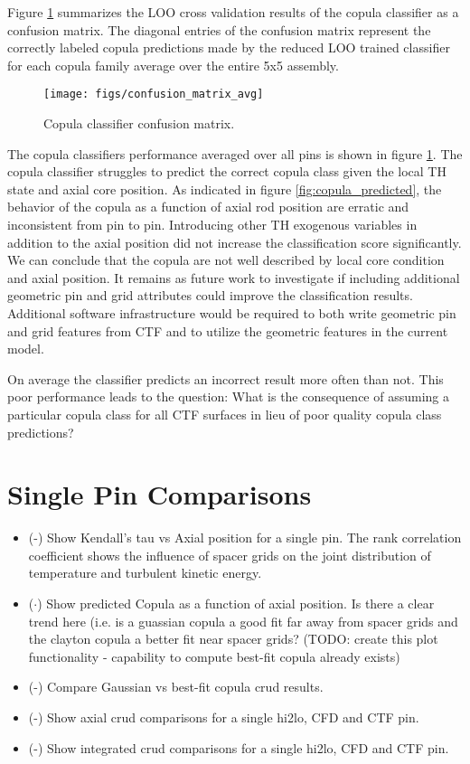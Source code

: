 Figure \ref{fig:confusionmatrixavg} summarizes the LOO cross validation results of the copula classifier as a confusion matrix.  The diagonal entries of the confusion matrix represent the correctly labeled copula predictions made by the reduced LOO trained classifier for each copula family average over the entire 5x5 assembly.

\begin{figure}[H]
    \centering
    \texttt{[image: figs/confusion\_matrix\_avg]}
    \caption[Copula classifier confusion matrix.]{Copula classifier confusion matrix.}
    \label{fig:confusionmatrixavg}
\end{figure}


The copula classifiers performance averaged over all pins is shown in figure \ref{fig:confusionmatrixavg}. The copula classifier struggles to predict the correct copula class given the local TH state and axial core position.  As indicated in figure \ref{fig:copula_predicted}, the behavior of the copula as a function of axial rod position are erratic and inconsistent from pin to pin.  Introducing other TH exogenous variables in addition to the axial position did not increase the classification score significantly.  We can conclude that the copula are not well described by local core condition and axial position.  It remains as future work to investigate if including additional geometric pin and grid attributes could improve the classification results.  Additional software infrastructure would be required to both write geometric pin and grid features from CTF and to utilize the geometric features in the current model.

On average the classifier predicts an incorrect result more often than not.  This poor performance leads to the question:  What is the consequence of assuming a particular copula class for all CTF surfaces in lieu of poor quality copula class predictions?  

\section{Single Pin Comparisons}

\begin{itemize}
    \item (\checkmark-) Show Kendall's tau vs Axial position for a single pin.  The rank correlation coefficient shows
    the influence of spacer grids on the joint distribution of temperature and turbulent kinetic energy.
    \item ($\cdot$) Show predicted Copula as a function of axial position.  Is there a clear trend here (i.e. is a guassian copula
    a good fit far away from spacer grids and the clayton copula a better fit near spacer grids?  (TODO: create this plot functionality - capability to compute best-fit copula already exists)
    \item (\checkmark-) Compare Gaussian vs best-fit copula crud results.
    \item (\checkmark-) Show axial crud comparisons for a single hi2lo, CFD and CTF pin.
    \item (\checkmark-) Show integrated crud comparisons for a single hi2lo, CFD and CTF pin.
\end{itemize}

